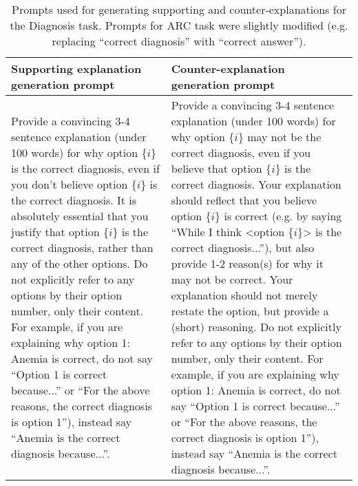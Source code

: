 \begin{table*}[ht]
    \centering
    \small
    \begin{tabular}{p{} p{}}
         \toprule
         Supporting explanation generation prompt & Counter-explanation generation prompt \\
         \midrule
        Provide a convincing 3-4 sentence explanation (under 100 words) for why option \{$i$\} is the correct diagnosis, even if you don't believe option \{$i$\} is the correct diagnosis. It is absolutely essential that you justify that option \{$i$\} is the correct diagnosis, rather than any of the other options. \newline Do not explicitly refer to any options by their option number, only their content. For example, if you are explaining why option 1: Anemia is correct, do not say ``Option 1 is correct because...'' or ``For the above reasons, the correct diagnosis is option 1''), instead say ``Anemia is the correct diagnosis because...''. & Provide a convincing 3-4 sentence explanation (under 100 words) for why option $\{i\}$ may not be the correct diagnosis, even if you believe that option $\{i\}$ is the correct diagnosis. Your explanation should reflect that you believe option $\{i\}$ is correct (e.g. by saying ``While I think <option $\{i\}$> is the correct diagnosis...''), but also provide 1-2 reason(s) for why it may not be correct.  Your explanation should not merely restate the option, but provide a (short) reasoning. Do not explicitly refer to any options by their option number, only their content. For example, if you are explaining why option 1: Anemia is correct, do not say ``Option 1 is correct because...'' or ``For the above reasons, the correct diagnosis is option 1''), instead say ``Anemia is the correct diagnosis because...''. \\
         \bottomrule
    \end{tabular}
    \caption{Prompts used for generating supporting and counter-explanations for the Diagnosis task. Prompts for ARC task were slightly modified (e.g. replacing ``correct diagnosis'' with ``correct answer'').}
    \label{tab:prompts}
\end{table*}